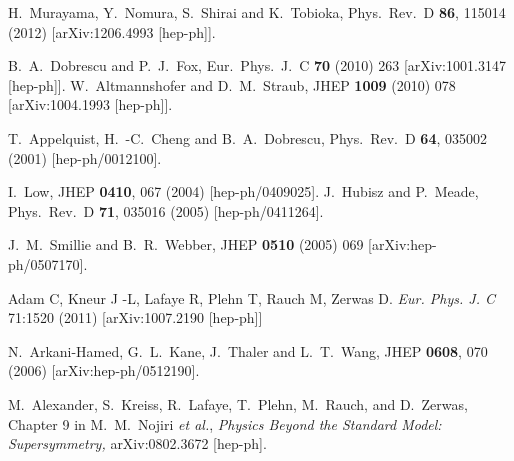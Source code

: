 \begin{thebibliography}{99}
  H.~Murayama, Y.~Nomura, S.~Shirai and K.~Tobioka,
  Phys.\ Rev.\ D {\bf 86}, 115014 (2012)
  [arXiv:1206.4993 [hep-ph]].



  B.~A.~Dobrescu and P.~J.~Fox,
  Eur.\ Phys.\ J.\ C {\bf 70} (2010) 263
  [arXiv:1001.3147 [hep-ph]].
  W.~Altmannshofer and D.~M.~Straub,
  JHEP {\bf 1009} (2010) 078
  [arXiv:1004.1993 [hep-ph]].



  T.~Appelquist, H.~-C.~Cheng and B.~A.~Dobrescu,
  Phys.\ Rev.\ D {\bf 64}, 035002 (2001)
  [hep-ph/0012100].

  I.~Low,
  JHEP {\bf 0410}, 067 (2004)
  [hep-ph/0409025].
  J.~Hubisz and P.~Meade,
  Phys.\ Rev.\ D {\bf 71}, 035016 (2005)
  [hep-ph/0411264].

  J.~M.~Smillie and B.~R.~Webber,
  JHEP {\bf 0510} (2005) 069
  [arXiv:hep-ph/0507170].


 Adam C,  Kneur J -L, Lafaye R, Plehn T, Rauch M, Zerwas D.
\textit{Eur. Phys. J. C} 71:1520 (2011) 
 [arXiv:1007.2190 [hep-ph]]
 
  N.~Arkani-Hamed, G.~L.~Kane, J.~Thaler and L.~T.~Wang,
  JHEP {\bf 0608}, 070 (2006)
  [arXiv:hep-ph/0512190].


 M.~Alexander, S.~Kreiss, R.~Lafaye, T.~Plehn,
M.~Rauch, and D.~Zerwas, Chapter 9 in M.~M.~Nojiri \textit{et al.},
\textit{Physics Beyond the Standard Model: Supersymmetry,}
arXiv:0802.3672 [hep-ph]. %


\end{thebibliography}
